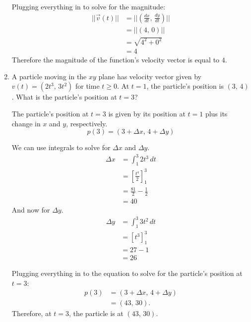 \documentclass[12pt]{article}
\begin{document}
\begin{enumerate}
          Plugging everything in to solve for the magnitude:
          \begin{align*}
              ||\vec{v}(t)|| & = ||(\frac{dx}{dt}, \, \frac{dy}{dt})|| \\[6pt]
                             & = ||(4, \, 0)||                         \\
                             & = \sqrt{4^2 + 0^2}                      \\
                             & = 4
          \end{align*}
          Therefore the magnitude of the function's velocity vector is equal to $4$.
          \bigskip

    \item A particle moving in the $xy$ plane has velocity vector given by $v(t) = (2t^3, \, 3t^2)$ for time $t \ge 0$. At $t=1$, the particle's position is $(3, \, 4)$. What is the particle's position at $t=3$?

          The particle's position at $t=3$ is given by its position at $t=1$ plus its change in $x$ and $y$, respectively.
          \[ p(3) = (3 + \Delta x, \, 4 + \Delta y) \]

          We can use integrals to solve for $\Delta x$ and $\Delta y$.
          \begin{align*}
              \Delta x & = \int_1^3 2t^3 \, dt              \\
                       & = \left[ \frac{t^4}{2} \right]_1^3 \\[6pt]
                       & = \frac{81}{2} - \frac{1}{2}       \\[6pt]
                       & = 40
          \end{align*}
          And now for $\Delta y$.
          \begin{align*}
              \Delta y & = \int_1^3 3t^2 \, dt    \\
                       & = \left[ t^3 \right]_1^3 \\
                       & = 27 - 1                 \\
                       & = 26
          \end{align*}

          Plugging everything in to the equation to solve for the particle's position at $t=3$:
          \begin{align*}
              p(3) & = (3 + \Delta x, \, 4 + \Delta y) \\
                   & = (43, \, 30).
          \end{align*}
          Therefore, at $t=3$, the particle is at $(43, \, 30)$.
\end{enumerate}
\end{document}
